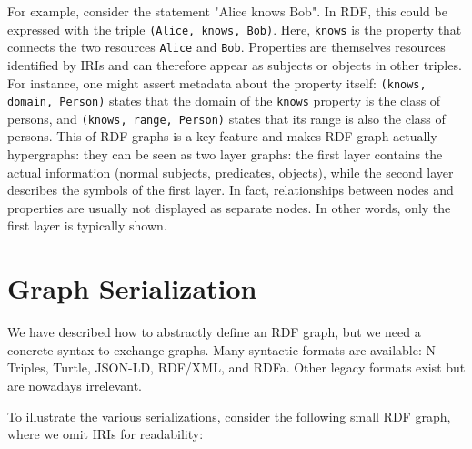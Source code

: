For example, consider the statement "Alice knows Bob". In RDF, this could be expressed with the triple \texttt{(Alice, knows, Bob)}. 
Here, \texttt{knows} is the property that connects the two resources \texttt{Alice} and \texttt{Bob}. 
Properties are themselves resources identified by IRIs and can therefore appear as subjects or objects in other triples. 
For instance, one might assert metadata about the property itself: \texttt{(knows, domain, Person)} states that the domain of the \texttt{knows} property is the class of persons, and \texttt{(knows, range, Person)} states that its range is also the class of persons. 
This  of RDF graphs is a key feature and makes RDF graph actually hypergraphs: they can be seen as two layer graphs: the first layer contains the actual information (normal subjects, predicates, objects), while the second layer describes the symbols of the first layer.
In fact, relationships between nodes and properties are usually not displayed as separate nodes. In other words, only the first layer is typically shown.

\section{Graph Serialization}
We have described how to abstractly define an RDF graph, but we need a concrete syntax to exchange graphs. Many syntactic formats are available: N-Triples, Turtle, JSON-LD, RDF/XML, and RDFa. Other legacy formats exist but are nowadays irrelevant.

To illustrate the various serializations, consider the following small RDF graph, where we omit IRIs for readability:

\begin{center}
\end{center}


